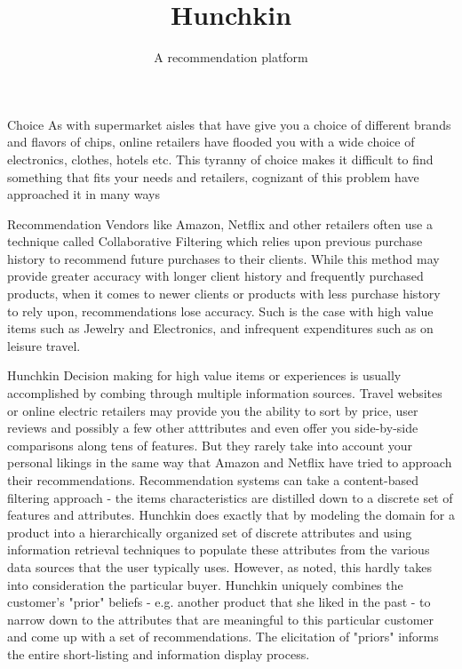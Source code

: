 \documentclass[DIV=calc, paper=a4, fontsize=11pt, twocolumn]{scrartcl}	 %
\title{Hunchkin} %
\author{A recommendation platform} %
\date{} %
\newcommand{\initial}[1]{ %
\lettrine[lines=2,lhang=0.1,nindent=0em]{
\color{DarkGoldenrod}
{\textsf{#1}}}{}}
\begin{document}
\maketitle %

\thispagestyle{fancy} %
\section*{}

\initial{Choice}
As with supermarket aisles that have give you a choice of different brands and flavors of chips, online retailers have flooded you with a wide choice of electronics, clothes, hotels etc. This tyranny of choice makes it difficult to find something that fits your needs and retailers, cognizant of this problem have approached it in many ways 

\initial{Recommendation}
Vendors like Amazon, Netflix and other retailers often use a technique called Collaborative Filtering which relies upon previous purchase history to recommend future purchases to their clients. While this method may provide greater accuracy with longer client history and frequently purchased products, when it comes to newer clients or products with less purchase history to rely upon, recommendations lose accuracy. Such is the case with high value items such as Jewelry and Electronics, and infrequent expenditures such as on leisure travel. 

\initial{Hunchkin}
Decision making for high value items or experiences is usually accomplished by combing through multiple information sources. Travel websites or online electric retailers may provide you the ability to sort by price, user reviews and possibly a few other atttributes and even offer you side-by-side comparisons along tens of features. But they rarely take into account your personal likings in the same way that Amazon and Netflix have tried to approach their recommendations. Recommendation systems can take a content-based filtering approach - the items characteristics are distilled down to a discrete set of features and attributes. Hunchkin does exactly that by modeling the domain for a product into a hierarchically organized set of discrete attributes and using information retrieval techniques to populate these attributes from the various data sources that the user typically uses. However, as noted, this hardly takes into consideration the particular buyer. Hunchkin uniquely combines the customer's "prior" beliefs - e.g. another product that she liked in the past - to narrow down to the attributes that are meaningful to this particular customer and come up with a set of recommendations. The elicitation of "priors" informs the entire short-listing and information display process. 
\end{document}
